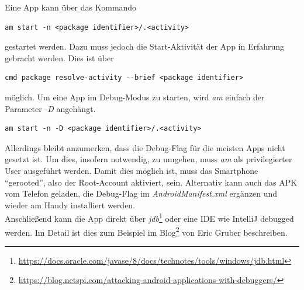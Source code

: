 			Eine App kann über das Kommando
			\begin{lstlisting}
am start -n <package identifier>/.<activity>
			\end{lstlisting}
			gestartet werden. Dazu muss jedoch die Start-Aktivität der App in Erfahrung gebracht werden. Dies ist über
			\begin{lstlisting}
cmd package resolve-activity --brief <package identifier>
			\end{lstlisting}
			möglich. Um eine App im Debug-Modus zu starten, wird \textit{am} einfach der Parameter \textit{-D} angehängt.
			\begin{lstlisting}
am start -n -D <package identifier>/.<activity>
			\end{lstlisting}
			Allerdings bleibt anzumerken, dass die Debug-Flag für die meisten Apps nicht gesetzt ist. Um dies, insofern notwendig, zu umgehen, muss \textit{am}	als privilegierter User ausgeführt werden. Damit dies möglich ist, muss das Smartphone "`gerooted"', also der Root-Account aktiviert, sein. Alternativ kann auch das APK vom Telefon geladen, die Debug-Flag im \textit{AndroidManifest.xml} ergänzen und wieder am Handy installiert werden.\\
			
			Anschließend kann die App direkt über \textit{jdb}\footnote{\url{https://docs.oracle.com/javase/8/docs/technotes/tools/windows/jdb.html}} oder eine IDE wie IntelliJ debugged werden. Im Detail ist dies zum Beispiel im Blog\footnote{\url{https://blog.netspi.com/attacking-android-applications-with-debuggers/}} von Eric Gruber beschreiben.\\
			
			
			
